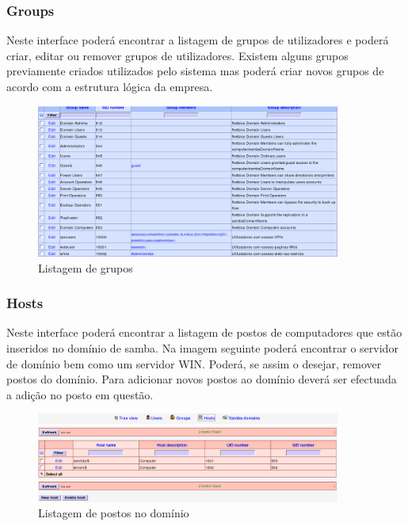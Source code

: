 \subsubsection{Groups}

Neste interface poderá encontrar a listagem de grupos de utilizadores e poderá criar, editar ou remover grupos de utilizadores. Existem alguns grupos previamente criados utilizados pelo sistema mas poderá criar novos grupos de acordo com a estrutura lógica da empresa.

\begin{figure}[H]
    \begin{center}
        \includegraphics[width=10cm]{include/img/lam6}
    \end{center}
    \caption{Listagem de grupos}
    \label{fig:LAM6}
\end{figure}

\subsubsection{Hosts}

Neste interface poderá encontrar a listagem de postos de computadores que estão inseridos no domínio de samba. Na imagem seguinte poderá encontrar o servidor de domínio bem como um servidor WIN. Poderá, se assim o desejar, remover postos do domínio. Para adicionar novos postos ao domínio deverá ser efectuada a adição no posto em questão.

\begin{figure}[H]
    \begin{center}
        \includegraphics[width=10cm]{include/img/lam7}
    \end{center}
    \caption{Listagem de postos no domínio}
    \label{fig:LAM7}
\end{figure}

